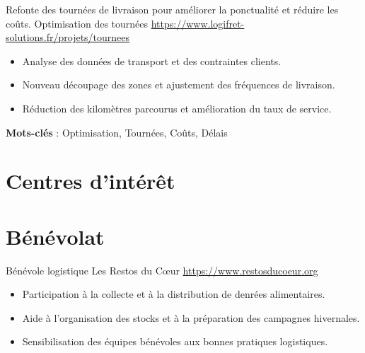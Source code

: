 \documentclass[a4paper, serif, 10pt]{moderncv}
\begin{document}
        {Refonte des tournées de livraison pour améliorer la ponctualité et réduire les coûts.}
        {Optimisation des tournées}
        {\url{https://www.logifret-solutions.fr/projets/tournees}}
        {}
        {\begin{itemize}
\item Analyse des données de transport et des contraintes clients.
\item Nouveau découpage des zones et ajustement des fréquences de livraison.
\item Réduction des kilomètres parcourus et amélioration du taux de service.
\end{itemize}
\textbf{Mots-clés} : Optimisation, Tournées, Coûts, Délais}
\section{Centres d'intérêt}

\section{Bénévolat}

        {Bénévole logistique}
        {Les Restos du Cœur}
        {\url{https://www.restosducoeur.org}}
        {}
        {\begin{itemize}
\item Participation à la collecte et à la distribution de denrées alimentaires.
\item Aide à l'organisation des stocks et à la préparation des campagnes hivernales.
\item Sensibilisation des équipes bénévoles aux bonnes pratiques logistiques.
\end{itemize}}
    
\end{document}
